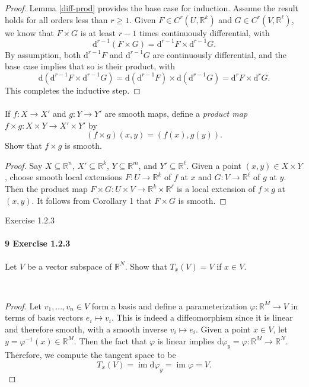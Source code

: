 \documentclass[12pt]{article}
\newlength{\myparskip}
\newenvironment{fullbox}{\begin{lrbox}{\savefullbox}\begin{minipage}{\dimexpr\textwidth-2\fboxsep\relax}\setlength{\parskip}{\myparskip}}{\end{minipage}\end{lrbox}\framebox[\textwidth]{\usebox{\savefullbox}}}
\newenvironment{pbox}[1][]{\begin{fullbox}\ifx#1\empty\else\paragraph{#1}\phantom{}\fi}{\end{fullbox}}
\theoremstyle{definition}
\newcommand{\R}{\mathbb{R}}
\renewcommand{\phi}{\varphi}
\newcommand{\<}{\langle}
\renewcommand{\>}{\rangle}
\newcommand{\seq}{\subseteq}
\DeclareMathOperator{\im}{im}
\newcommand{\dd}{\mathrm{d}}
\begin{document}
\begin{proof}
    Lemma \ref{diff-prod} provides the base case for induction.
    Assume the result holds for all orders less than $r \geq 1$.
    Given $F \in C^r(U, \R^k)$ and $G \in C^r(V, \R^\ell)$, we know that $F \times G$ is at least $r - 1$ times continuously differential, with
    \[
        \dd^{r-1}(F \times G) = \dd^{r-1}{F} \times \dd^{r-1}{G}.
    \]
    By assumption, both $\dd^{r-1}F$ and $\dd^{r-1}{G}$ are continuously differential, and the base case implies that so is their product, with
    \[
        \dd(\dd^{r-1}{F} \times \dd^{r-1}{G})
            = \dd(\dd^{r-1}F) \times \dd(\dd^{r-1}{G})
            = \dd^rF \times \dd^rG.
    \]
    This completes the inductive step.
\end{proof}

\begin{pbox}[]
    If $f : X \to X'$ and $g : Y \to Y'$ are smooth maps, define a \textit{product map} $f \times g : X \times Y \to X' \times Y'$ by
    \[
        (f \times g)(x, y) = (f(x), g(y)).
    \]
    Show that $f \times g$ is smooth.
\end{pbox}

\begin{proof}
    Say $X \seq \R^n$, $X' \seq \R^k$, $Y \seq \R^m$, and $Y' \seq \R^\ell$.
    Given a point $(x, y) \in X \times Y$, choose smooth local extensions $F : U \to \R^k$ of $f$ at $x$ and $G : V \to \R^\ell$ of $g$ at $y$.
    Then the product map $F \times G : U \times V \to \R^k \times \R^\ell$ is a local extension of $f \times g$ at $(x, y)$.
    It follows from Corollary 1 that $F \times G$ is smooth.
\end{proof}

\begin{pbox}[9 Exercise 1.2.3]
    Let $V$ be a vector subspace of $\R^N$.
    Show that $T_x(V) = V$ if $x \in V$.
\end{pbox}\

\begin{proof}
    Let $v_1, \dots, v_n \in V$ form a basis and define a parameterization $\phi : \R^M \to V$ in terms of basis vectors $e_i \mapsto v_i$.
    This is indeed a diffeomorphism since it is linear and therefore smooth, with a smooth inverse $v_i \mapsto e_i$.
    Given a point $x \in V$, let $y = \phi^{-1}(x) \in \R^M$.
    Then the fact that $\phi$ is linear implies $\dd{\phi}_y = \phi : \R^M \to \R^N$.
    Therefore, we compute the tangent space to be
    \[
        T_x(V) = \im\dd{\phi}_y = \im \phi = V.
    \]
\end{proof}
\end{document}
